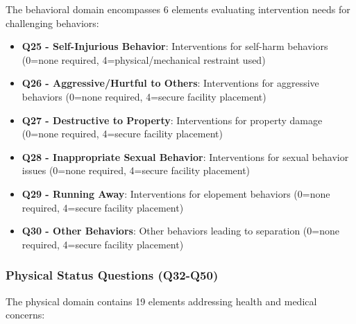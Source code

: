 \documentclass[12pt]{article}
\begin{document}
The behavioral domain encompasses 6 elements evaluating intervention needs for challenging behaviors:

\begin{itemize}
    \item \textbf{Q25 - Self-Injurious Behavior}: Interventions for self-harm behaviors (0=none required, 4=physical/mechanical restraint used)
    \item \textbf{Q26 - Aggressive/Hurtful to Others}: Interventions for aggressive behaviors (0=none required, 4=secure facility placement)
    \item \textbf{Q27 - Destructive to Property}: Interventions for property damage (0=none required, 4=secure facility placement)
    \item \textbf{Q28 - Inappropriate Sexual Behavior}: Interventions for sexual behavior issues (0=none required, 4=secure facility placement)
    \item \textbf{Q29 - Running Away}: Interventions for elopement behaviors (0=none required, 4=secure facility placement)
    \item \textbf{Q30 - Other Behaviors}: Other behaviors leading to separation (0=none required, 4=secure facility placement)
\end{itemize}

\subsubsection{Physical Status Questions (Q32-Q50)}

The physical domain contains 19 elements addressing health and medical concerns:
\end{document}
